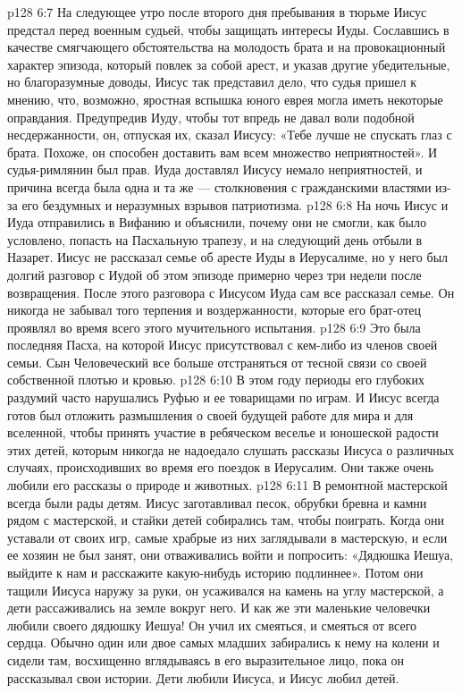 \vs p128 6:7 На следующее утро после второго дня пребывания в тюрьме Иисус предстал перед военным судьей, чтобы защищать интересы Иуды. Сославшись в качестве смягчающего обстоятельства на молодость брата и на провокационный характер эпизода, который повлек за собой арест, и указав другие убедительные, но благоразумные доводы, Иисус так представил дело, что судья пришел к мнению, что, возможно, яростная вспышка юного еврея могла иметь некоторые оправдания. Предупредив Иуду, чтобы тот впредь не давал воли подобной несдержанности, он, отпуская их, сказал Иисусу: «Тебе лучше не спускать глаз с брата. Похоже, он способен доставить вам всем множество неприятностей». И судья\hyp{}римлянин был прав. Иуда доставлял Иисусу немало неприятностей, и причина всегда была одна и та же --- столкновения с гражданскими властями из\hyp{}за его бездумных и неразумных взрывов патриотизма.
\vs p128 6:8 На ночь Иисус и Иуда отправились в Вифанию и объяснили, почему они не смогли, как было условлено, попасть на Пасхальную трапезу, и на следующий день отбыли в Назарет. Иисус не рассказал семье об аресте Иуды в Иерусалиме, но у него был долгий разговор с Иудой об этом эпизоде примерно через три недели после возвращения. После этого разговора с Иисусом Иуда сам все рассказал семье. Он никогда не забывал того терпения и воздержанности, которые его брат\hyp{}отец проявлял во время всего этого мучительного испытания.
\vs p128 6:9 Это была последняя Пасха, на которой Иисус присутствовал с кем\hyp{}либо из членов своей семьи. Сын Человеческий все больше отстраняться от тесной связи со своей собственной плотью и кровью.
\vs p128 6:10 \pc В этом году периоды его глубоких раздумий часто нарушались Руфью и ее товарищами по играм. И Иисус всегда готов был отложить размышления о своей будущей работе для мира и для вселенной, чтобы принять участие в ребяческом веселье и юношеской радости этих детей, которым никогда не надоедало слушать рассказы Иисуса о различных случаях, происходивших во время его поездок в Иерусалим. Они также очень любили его рассказы о природе и животных.
\vs p128 6:11 В ремонтной мастерской всегда были рады детям. Иисус заготавливал песок, обрубки бревна и камни рядом с мастерской, и стайки детей собирались там, чтобы поиграть. Когда они уставали от своих игр, самые храбрые из них заглядывали в мастерскую, и если ее хозяин не был занят, они отваживались войти и попросить: «Дядюшка Иешуа, выйдите к нам и расскажите какую\hyp{}нибудь историю подлиннее». Потом они тащили Иисуса наружу за руки, он усаживался на камень на углу мастерской, а дети рассаживались на земле вокруг него. И как же эти маленькие человечки любили своего дядюшку Иешуа! Он учил их смеяться, и смеяться от всего сердца. Обычно один или двое самых младших забирались к нему на колени и сидели там, восхищенно вглядываясь в его выразительное лицо, пока он рассказывал свои истории. Дети любили Иисуса, и Иисус любил детей.

